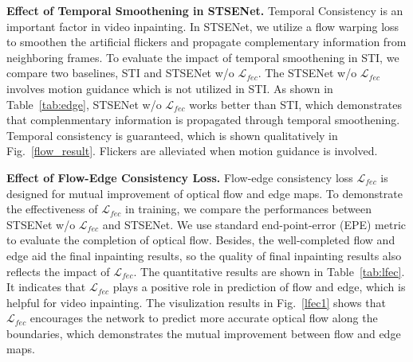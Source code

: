 \noindent \textbf{Effect of Temporal Smoothening in STSENet.}
Temporal Consistency is an important factor in video inpainting. In STSENet, we utilize a flow warping loss to smoothen the artificial flickers and propagate complementary information from neighboring frames. To evaluate the impact of temporal smoothening in STI, we compare two baselines, STI and STSENet w/o $\mathcal{L}_{fec}$. The STSENet w/o $\mathcal{L}_{fec}$ involves motion guidance which is not utilized in STI.
As shown in Table~\ref{tab:edge}, STSENet w/o $\mathcal{L}_{fec}$ works better than STI, which demonstrates that complenmentary information is propagated through temporal smoothening. Temporal consistency is guaranteed, which is shown qualitatively in Fig.~\ref{flow_result}. Flickers are alleviated when motion guidance is involved. 



\noindent \textbf{Effect of Flow-Edge Consistency Loss.}
Flow-edge consistency loss $\mathcal{L}_{fec}$ is designed for mutual improvement of optical flow and edge maps.
To demonstrate the effectiveness of $\mathcal{L}_{fec}$ in training, we compare the performances between STSENet w/o $\mathcal{L}_{fec}$ and STSENet. We use standard end-point-error (EPE) metric to evaluate the completion of optical flow. Besides, the well-completed flow and edge aid the final inpainting results, so the quality of final inpainting results also reflects the impact of $\mathcal{L}_{fec}$.
The quantitative results are shown in Table~\ref{tab:lfec}. It indicates that $\mathcal{L}_{fec}$ plays a positive role in prediction of flow and edge, which is helpful for video inpainting. The visulization results in Fig.~\ref{lfec1} shows that $\mathcal{L}_{fec}$ encourages the network to predict more accurate optical flow along the boundaries, which demonstrates the mutual improvement between flow and edge maps.
\begin{table}[t]
	\caption{The Impact of Flow-Edge Consistency Loss.}\smallskip
	
	\centering
	\label{tab:lfec}
\end{table}

